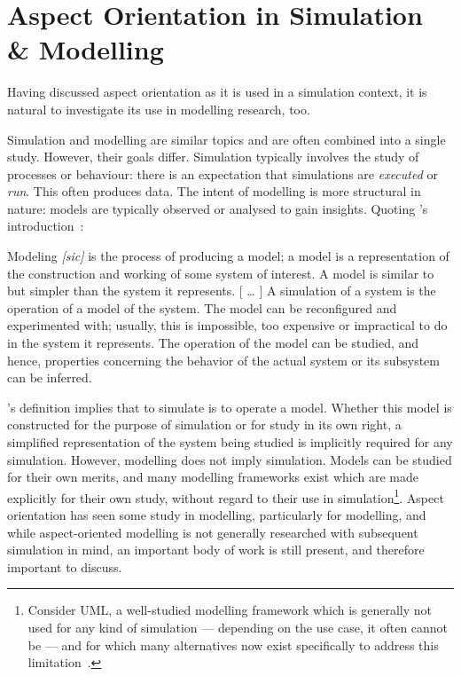 \section{Aspect Orientation in Simulation \& Modelling}\label{ao_and_modelling}


Having discussed aspect orientation as it is used in a simulation context, it is
natural to investigate its use in modelling research, too.

Simulation and modelling are similar topics and are often combined into a single
study. However, their goals differ. Simulation typically involves the study of
processes or behaviour: there is an expectation that simulations are
\emph{executed} or \emph{run}. This often produces data. The intent of modelling
is more structural in nature: models are typically observed or analysed to gain
insights. Quoting \citeauthor{smintro}'s introduction~\cite{smintro}:

\begin{displayquote}
    Modeling \emph{[sic]} is the process of producing a model; a model
    is a representation of the construction and working of
    some system of interest. A model is similar to but
    simpler than the system it represents.
    \newline{}
    [ \ldots{} ]
    \newline{}
    A simulation of a system is the operation of a model of the system. The
    model can be reconfigured and experimented with; usually, this is
    impossible, too expensive or impractical to do in the system it represents.
    The operation of the model can be studied, and hence, properties concerning
    the behavior of the actual system or its subsystem can be inferred.
\end{displayquote}

\citeauthor{smintro}'s definition implies that to simulate is to operate a
model. Whether this model is constructed for the purpose of simulation or for
study in its own right, a simplified representation of the system being studied
is implicitly required for any simulation. However, modelling does not imply
simulation. Models can be studied for their own merits, and many modelling
frameworks exist which are made explicitly for their own study, without regard
to their use in simulation\footnote{Consider UML, a well-studied modelling
framework which is generally not used for any kind of simulation --- depending
on the use case, it often cannot be --- and for which many alternatives now
exist specifically to address this
limitation~\cite{opm_original,ExecutableBPMNMitsyuk,obashimethodology}.}. Aspect
orientation has seen some study in modelling, particularly for \sociotechnical
modelling, and while aspect-oriented \sociotechnical modelling is not generally
researched with subsequent simulation in mind, an important body of work is
still present, and therefore important to discuss.

